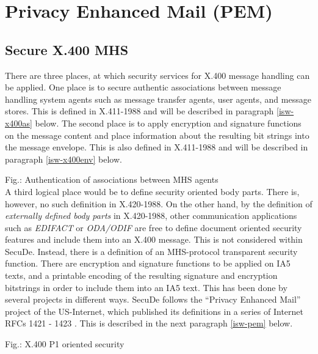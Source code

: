 \section{Privacy Enhanced Mail (PEM)}
\thispagestyle{myheadings}
\label{isw-pem}

\subsection{Secure X.400 MHS}
\label{isw-mhs}

There are three places, at which security services for X.400 message handling
can be applied.
One place is to secure authentic associations between message handling
system agents such as message transfer agents, user agents, and message
stores.
This is defined in X.411-1988 \cite{cci2}
and will be described in paragraph \ref{isw-x400as} below.
The second place is to apply encryption and signature functions
on the message content and place information about the resulting bit strings
into the message envelope.
This is also defined in X.411-1988
and will be described in paragraph \ref{isw-x400env} below.

\begin{center}
\end{center}
\label{fig-isw-mhs-1}
{\footnotesize Fig.:
Authentication of associations between MHS agents}
\\ [1em]
A third logical place would be to define security oriented
body parts. There is, however, no such definition in X.420-1988.
On the other hand, by the definition of {\em externally defined
body parts} in X.420-1988,
other communication applications such as {\em EDIFACT}
or {\em ODA/ODIF} are free to define document oriented security features
and include them into an X.400 message.
This is not considered within SecuDe.
Instead, there is a definition of an MHS-protocol transparent
security function. There are
encryption and signature functions
to be applied on IA5 texts, and a printable encoding
of the resulting signature and encryption bitstrings in order to include
them into an IA5 text.
This has been done by several projects in different ways.
SecuDe follows the
``Privacy Enhanced Mail'' project of the US-Internet,
which published its definitions
in a series of Internet RFCs 1421 - 1423 \cite{rfc1}.
This is described in the next paragraph \ref{isw-pem} below.
\begin{center}
\end{center}
\label{fig-isw-mhs-2}
{\footnotesize Fig.:
X.400 P1 oriented security}

